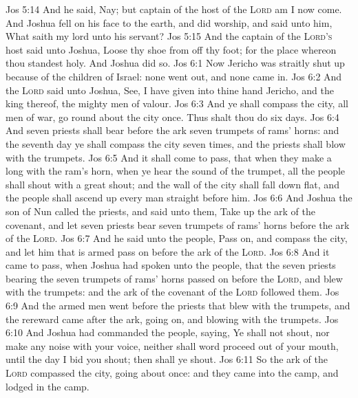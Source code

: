 \vs Jos 5:14 And he said, Nay; but  captain of the host of the \textsc{Lord} am I now come. And Joshua fell on his face to the earth, and did worship, and said unto him, What saith my lord unto his servant?
\vs Jos 5:15 And the captain of the \textsc{Lord's} host said unto Joshua, Loose thy shoe from off thy foot; for the place whereon thou standest  holy. And Joshua did so.
\vs Jos 6:1 Now Jericho was straitly shut up because of the children of Israel: none went out, and none came in.
\vs Jos 6:2 And the \textsc{Lord} said unto Joshua, See, I have given into thine hand Jericho, and the king thereof,  the mighty men of valour.
\vs Jos 6:3 And ye shall compass the city, all  men of war,  go round about the city once. Thus shalt thou do six days.
\vs Jos 6:4 And seven priests shall bear before the ark seven trumpets of rams' horns: and the seventh day ye shall compass the city seven times, and the priests shall blow with the trumpets.
\vs Jos 6:5 And it shall come to pass, that when they make a long  with the ram's horn,  when ye hear the sound of the trumpet, all the people shall shout with a great shout; and the wall of the city shall fall down flat, and the people shall ascend up every man straight before him.
\vs Jos 6:6 And Joshua the son of Nun called the priests, and said unto them, Take up the ark of the covenant, and let seven priests bear seven trumpets of rams' horns before the ark of the \textsc{Lord}.
\vs Jos 6:7 And he said unto the people, Pass on, and compass the city, and let him that is armed pass on before the ark of the \textsc{Lord}.
\vs Jos 6:8 And it came to pass, when Joshua had spoken unto the people, that the seven priests bearing the seven trumpets of rams' horns passed on before the \textsc{Lord}, and blew with the trumpets: and the ark of the covenant of the \textsc{Lord} followed them.
\vs Jos 6:9 And the armed men went before the priests that blew with the trumpets, and the rereward came after the ark,  going on, and blowing with the trumpets.
\vs Jos 6:10 And Joshua had commanded the people, saying, Ye shall not shout, nor make any noise with your voice, neither shall  word proceed out of your mouth, until the day I bid you shout; then shall ye shout.
\vs Jos 6:11 So the ark of the \textsc{Lord} compassed the city, going about  once: and they came into the camp, and lodged in the camp.
